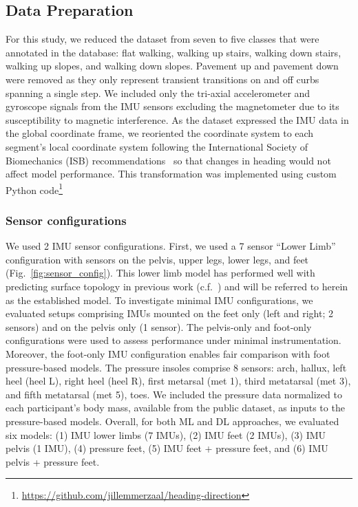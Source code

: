 \documentclass[sensors,article,submit,pdftex,moreauthors]{Definitions/mdpi}
\begin{document}
\subsection{Data Preparation}
For this study, we reduced the dataset from seven to five classes that were annotated in the database: \textcolor{revision}{flat walking}, walking up stairs, walking down stairs, walking up slopes, and walking down slopes. Pavement up and pavement down were removed as they only represent transient transitions on and off curbs spanning a single step. 
We included only the tri-axial accelerometer and gyroscope \textcolor{revision}{signals} from the IMU sensors excluding the magnetometer due to its susceptibility to magnetic interference. As the dataset expressed the IMU data in the global coordinate frame, we reoriented the coordinate system to each \textcolor{revision}{segment's} local coordinate system \textcolor{revision}{following the International Society of Biomechanics (ISB) recommendations~\cite{wu2002isb}} so that changes in heading would not affect model performance. This transformation was implemented using custom Python code\footnote{\url{https://github.com/jillemmerzaal/heading-direction}}

\subsubsection{Sensor configurations}
We used 2 IMU sensor configurations. First, we used a 7 sensor ``Lower Limb'' configuration with sensors on the pelvis, upper legs, lower legs, and feet (Fig.~\ref{fig:sensor_config}). This lower limb model has performed well with predicting surface topology in previous work (c.f.~\cite{chauhan2025classifying}) and will be referred to herein as the established model. \textcolor{revision2}{To investigate minimal IMU configurations, we  evaluated setups comprising IMUs mounted on the feet only (left and right; 2 sensors) and on the pelvis only (1 sensor). The pelvis-only and foot-only configurations were used to assess performance under minimal instrumentation. Moreover, the foot-only IMU configuration enables fair comparison with foot pressure-based models.} The pressure insoles \textcolor{revision2}{comprise} 8 sensors: arch, hallux, left heel (heel L), right heel (heel R), first metarsal (met 1), third metatarsal (met 3), and fifth metatarsal (met 5), toes. We included the  pressure data normalized to each participant's body mass\textcolor{revision2}{, available from the public dataset, as inputs to the pressure-based models}. 
\textcolor{revision2}{Overall, for both ML and DL approaches, we evaluated six models: (1) IMU lower limbs (7 IMUs), (2) IMU feet (2 IMUs), (3) IMU pelvis (1 IMU), (4) pressure feet, (5) IMU feet + pressure feet, and (6) IMU pelvis + pressure feet.}
\end{document}

